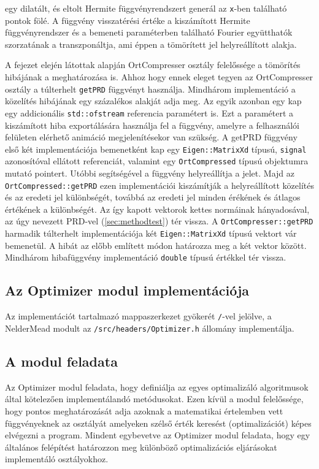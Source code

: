 \documentclass[oneside,titlepage,12pt,a4paper]{report}
\begin{document}
 egy dilatált, és eltolt Hermite függvényrendszert generál az \texttt{x}-ben található pontok fölé. A függvény visszatérési értéke a kiszámított Hermite függvényrendszer és a bemeneti paraméterben található Fourier együtthatók szorzatának a transzponáltja, ami éppen a tömörített jel helyreállított alakja.
\par A fejezet elején látottak alapján OrtCompresser osztály felelőssége a tömörítés hibájának a meghatározása is. Ahhoz hogy ennek eleget tegyen az OrtCompresser osztály a túlterhelt \texttt{getPRD} függvényt használja. Mindhárom implementáció a közelítés hibájának egy százalékos alakját adja meg. Az egyik azonban egy kap egy addicionális \texttt{std::ofstream} referencia paramétert is. Ezt a paramétert a kiszámított hiba exportálására használja fel a függvény, amelyre a felhasználói felületen elérhető animáció megjelenítésekor van szükség. A getPRD függvény első két implementációja bemenetként kap egy \texttt{Eigen::MatrixXd} típusú, \texttt{signal} azonosítóval ellátott referenciát,  valamint egy \texttt{OrtCompressed} típusú objektumra mutató pointert. Utóbbi segítségével a függvény helyreállítja a jelet. Majd az \texttt{OrtCompressed::getPRD} ezen implementációi kiszámítják a helyreállított közelítés és az eredeti jel különbségét, továbbá az eredeti jel minden érékének és átlagos értékének a különbségét. Az így kapott vektorok kettes normáinak hányadosával, az úgy nevezett PRD-vel (\ref{sec:methodtest}) tér vissza. A \texttt{OrtCompresser::getPRD} harmadik túlterhelt implementációja két \texttt{Eigen::MatrixXd} típusú vektort vár bemenetül. A hibát az előbb említett módon határozza meg a két vektor között. Mindhárom hibafüggvény implementáció \texttt{double} típusú értékkel tér vissza. 

\subsection{Az Optimizer modul implementációja} \label{subsec::opterimp}

Az implementációt tartalmazó mappaszerkezet gyökerét \texttt{/}-vel jelölve, a NelderMead modult  az \texttt{/src/headers/Optimizer.h} állomány implementálja.

\subsection*{A modul feladata}

\par Az Optimizer modul feladata, hogy definiálja az egyes optimalizáló algoritmusok által kötelezően implementálandó metódusokat. Ezen kívül a modul felelőssége, hogy pontos meghatározását adja azoknak a matematikai értelemben vett függvényeknek az osztályát amelyeken szélső érték keresést (optimalizációt) képes elvégezni a program. Mindent egybevetve az Optimizer modul feladata, hogy egy általános felépítést határozzon meg különböző optimalizációs eljárásokat implementáló osztályokhoz. 
\end{document}
